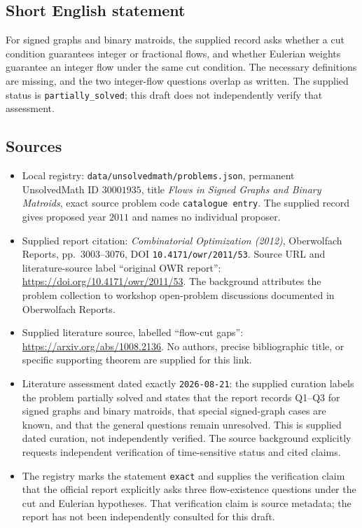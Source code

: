 \documentclass[11pt]{article}
\begin{document}
\subsection{Short English statement}
For signed graphs and binary matroids, the supplied record asks whether a cut condition guarantees integer or fractional flows, and whether Eulerian weights guarantee an integer flow under the same cut condition. The necessary definitions are missing, and the two integer-flow questions overlap as written. The supplied status is \texttt{partially\_solved}; this draft does not independently verify that assessment.
\subsection{Sources}
\begin{itemize}
\item Local registry: \texttt{data/unsolvedmath/problems.json}, permanent UnsolvedMath ID \(30001935\), title \emph{Flows in Signed Graphs and Binary Matroids}, exact source problem code \texttt{catalogue entry}. The supplied record gives proposed year \(2011\) and names no individual proposer.
\item Supplied report citation: \emph{Combinatorial Optimization (2012)}, Oberwolfach Reports, pp.~3003--3076, DOI \texttt{10.4171/owr/2011/53}. Source URL and literature-source label ``original OWR report'': \url{https://doi.org/10.4171/owr/2011/53}. The background attributes the problem collection to workshop open-problem discussions documented in Oberwolfach Reports.
\item Supplied literature source, labelled ``flow-cut gaps'': \url{https://arxiv.org/abs/1008.2136}. No authors, precise bibliographic title, or specific supporting theorem are supplied for this link.
\item Literature assessment dated exactly \texttt{2026-08-21}: the supplied curation labels the problem partially solved and states that the report records Q1--Q3 for signed graphs and binary matroids, that special signed-graph cases are known, and that the general questions remain unresolved. This is supplied dated curation, not independently verified. The source background explicitly requests independent verification of time-sensitive status and cited claims.
\item The registry marks the statement \texttt{exact} and supplies the verification claim that the official report explicitly asks three flow-existence questions under the cut and Eulerian hypotheses. That verification claim is source metadata; the report has not been independently consulted for this draft.
\end{itemize}
\end{document}

